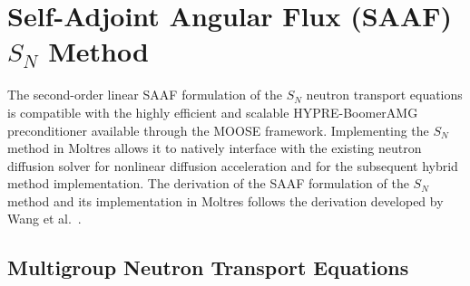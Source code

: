 
\section{Self-Adjoint Angular Flux (SAAF) $S_N$ Method} \label{sec:saaf}

The second-order linear \gls{SAAF} formulation of the $S_N$ neutron transport equations is
compatible with the highly efficient and scalable HYPRE-BoomerAMG preconditioner
\cite{hypre_hypre_2022} available through
the \gls{MOOSE} framework. Implementing the $S_N$ method in Moltres allows it to natively interface
with the existing neutron diffusion solver for nonlinear diffusion acceleration and for the
subsequent hybrid method implementation.
The derivation of the \gls{SAAF} formulation of the $S_N$ method and its
implementation in Moltres follows the derivation developed by Wang et al.\
\cite{wang_diffusion_2014, wang_rattlesnake_2018}.

\subsection{Multigroup Neutron Transport Equations}

